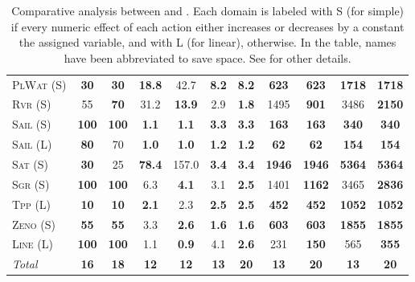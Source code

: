 \documentclass[11pt,landscape]{article}
\begin{document}
\begin{table*}[tb]
{\begin{tabular}{|l||cc||cc||cc||cc||cc||}
\textsc{PlWat} (S)&\textbf{30}&\textbf{30}&\textbf{18.8}&42.7&\textbf{8.2}&\textbf{8.2}&\textbf{623}&\textbf{623}&\textbf{1718}&\textbf{1718}\\
\textsc{Rvr} (S)&55&\textbf{70}&31.2&\textbf{13.9}&2.9&\textbf{1.8}&1495&\textbf{901}&3486&\textbf{2150}\\
\textsc{Sail} (S)&\textbf{100}&\textbf{100}&\textbf{1.1}&\textbf{1.1}&\textbf{3.3}&\textbf{3.3}&\textbf{163}&\textbf{163}&\textbf{340}&\textbf{340}\\
\textsc{Sail} (L)&\textbf{80}&70&\textbf{1.0}&\textbf{1.0}&\textbf{1.2}&\textbf{1.2}&\textbf{62}&\textbf{62}&\textbf{154}&\textbf{154}\\
\textsc{Sat} (S)&\textbf{30}&25&\textbf{78.4}&157.0&\textbf{3.4}&\textbf{3.4}&\textbf{1946}&\textbf{1946}&\textbf{5364}&\textbf{5364}\\
\textsc{Sgr} (S)&\textbf{100}&\textbf{100}&6.3&\textbf{4.1}&3.1&\textbf{2.5}&1401&\textbf{1162}&3465&\textbf{2836}\\
\textsc{Tpp} (L)&\textbf{10}&\textbf{10}&\textbf{2.1}&2.3&\textbf{2.5}&\textbf{2.5}&\textbf{452}&\textbf{452}&\textbf{1052}&\textbf{1052}\\
\textsc{Zeno} (S)&\textbf{55}&\textbf{55}&3.3&\textbf{2.6}&\textbf{1.6}&\textbf{1.6}&\textbf{603}&\textbf{603}&\textbf{1855}&\textbf{1855}\\
\textsc{Line} (L)&\textbf{100}&\textbf{100}&1.1&\textbf{0.9}&4.1&\textbf{2.6}&231&\textbf{150}&565&\textbf{355}
\\\hline
\textit{Total}&\textbf{16}&\textbf{18}&\textbf{12}&\textbf{12}&\textbf{13}&\textbf{20}&\textbf{13}&\textbf{20}&\textbf{13}&\textbf{20}\\\hline

        \end{tabular}}
        \caption{Comparative analysis between  \pattya and \pattye. Each domain is labeled with S (for simple) if every numeric effect of each action either increases or decreases by a constant the assigned variable, and with L (for linear), otherwise. In the table, names have been abbreviated to save space.  See \cite{ipc2023} for other details.}
        \label{tab:exp-patty-a-patty-e}
        \end{table*}
        
\end{document}
